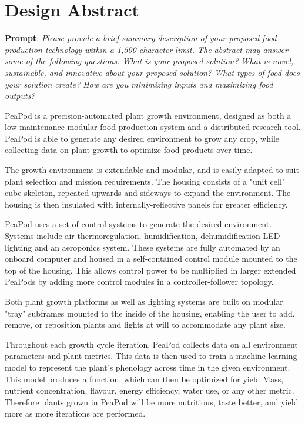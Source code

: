\documentclass{report}
\begin{document}
\tableofcontents
\newpage

\section{Design Abstract}
\textbf{Prompt}: \textit{Please provide a brief summary description of your proposed food production technology within a 1,500 character limit. The abstract may answer some of the following questions: What is your proposed solution? What is novel, sustainable, and innovative about your proposed solution? What types of food does your solution create? How are you minimizing inputs and maximizing food outputs?}

PeaPod is a precision-automated plant growth environment, designed as both a low-maintenance modular food production system and a distributed research tool. PeaPod is able to generate any desired environment to grow any crop, while collecting data on plant growth to optimize food products over time.

The growth environment is extendable and modular, and is easily adapted to suit plant selection and mission requirements. The housing consists of a "unit cell" cube skeleton, repeated upwards and sideways to expand the environment. The housing is then insulated with internally-reflective panels for greater efficiency.

PeaPod uses a set of control systems to generate the desired environment. Systems include air thermoregulation, humidification, dehumidification LED lighting and an aeroponics system. These systems are fully automated by an onboard computer and housed in a self-contained control module mounted to the top of the housing. This allows control power to be multiplied in larger extended PeaPods by adding more control modules in a controller-follower topology.

Both plant growth platforms as well as lighting systems are built on modular "tray" subframes mounted to the inside of the housing, enabling the user to add, remove, or reposition plants and lights at will to accommodate any plant size.

Throughout each growth cycle iteration, PeaPod collects data on all environment parameters and plant metrics. This data is then used to train a machine learning model to represent the plant's phenology across time in the given environment. This model produces a function, which can then be optimized for yield Mass, nutrient concentration, flavour, energy efficiency, water use, or any other metric. Therefore plants grown in PeaPod will be more nutritious, taste better, and yield more as more iterations are performed.
\end{document}

